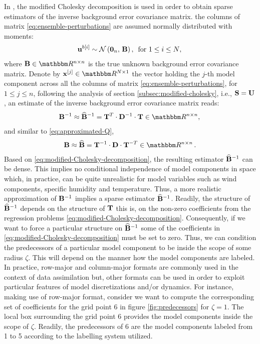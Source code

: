 \documentclass[12pt]{article}
\newcommand{\ub}{{\bf u}}
\newcommand{\T}{{\bf T}}
\newcommand{\ra}{\zeta}
\newcommand{\Nens}{N} \newcommand{\Nobs}{m} \newcommand{\Nstate}{n} \newcommand{\X}{{\bf X}} \newcommand{\x}{{\bf x}} \newcommand{\J}{\mathcal{J}} \newcommand{\lp}{\left (} \newcommand{\rp}{\right )} \newcommand{\lb}{\left [} \newcommand{\rb}{\right ]} \renewcommand{\ln}{\left \|} \newcommand{\rn}{\right \|}
\newcommand{\B}{{\bf B}} \newcommand{\R}{{\bf R}} \newcommand{\N}{M} \newcommand{\y}{{\bf y}} \renewcommand{\H}{{\bf H}} \newcommand{\xm}{{\overline{\bf x}}} \newcommand{\xb}{{\bf x}^{\rm b}} \newcommand{\BAS}{{{\boldsymbol \Phi} }} \newcommand{\bas}{{{ \boldsymbol \phi} }} \newcommand{\w}{{\bf r}} \newcommand{\W}{{\boldsymbol \alpha}} \newcommand{\I}{{\bf I}} \newcommand{\M}{\mathcal{M}} \newcommand{\Nor}{\mathcal{N}} \newcommand{\Y}{{\bf Y}} \newcommand{\xt}{{\bf x}^{\rm true}} \newcommand{\Ho}{{\mathcal{H}}} \newcommand{\lle}{\left \{ } \newcommand{\rle}{\right \}} \newcommand{\dx}{{{\boldsymbol \delta} {\bf x}}}
\renewcommand{\S}{{\bf S}} \newcommand{\errobs}{{\boldsymbol \epsilon}} \newcommand{\errbac}{{\boldsymbol \xi}} \newcommand{\K}{{\bf K}} \newcommand{\Prob}{{\mathcal{P}}} \newcommand{\bases}{{\boldsymbol \Phi}}
\newcommand{\D}{{\bf D}}
\newcommand{\zero}{{\bf 0}}
\newcommand{\BEST}{\widehat{\bf B}}
\newcommand{\U}{{\bf U}}
\begin{document}
In \cite{nino2016enkf-mc}, the modified Cholesky decomposition is used in order to obtain sparse estimators of the inverse background error covariance matrix. the columns of matrix \eqref{eq:ensemble-perturbations} are assumed normally distributed with moments:
\begin{eqnarray}
\ub^{b[i]} \sim \Nor \lp \zero_{\Nstate},\, \B \rp, \,\text{ for $1 \le i \le \Nens$},\,
\end{eqnarray}
where $\B \in \Re^{\Nstate \times \Nstate}$ is the true unknown background error covariance matrix. Denote by $\x^{[j]} \in \Re^{\Nens \times 1}$ the vector holding the $j$-th model component across all the columns of matrix \eqref{eq:ensemble-perturbations}, for $1 \le j \le \Nstate$, following the analysis of section \ref{subsec:modified-cholesky}, i.e., $\S = \U$, an estimate of the inverse background error covariance matrix reads:
\begin{eqnarray}
\label{eq:inverse-B}
\displaystyle
\B^{-1} \approx \BEST^{-1} =  \T^T \cdot \D^{-1} \cdot \T \in \Re^{\Nstate \times \Nstate},\,
\end{eqnarray}
and similar to \eqref{eq:approximated-Q}, 
\begin{eqnarray}
\label{eq:B}
\displaystyle
\B \approx \BEST = \T^{-1} \cdot \D \cdot \T^{-T} \in \Re^{\Nstate \times \Nstate} \,.
\end{eqnarray}
Based on \eqref{eq:modified-Cholesky-decomposition}, the resulting estimator $\BEST^{-1}$ can be dense. This implies no conditional independence of model components in space which, in practice, can be quite unrealistic for model variables such as wind components, specific humidity and temperature. Thus, a more realistic approximation of $\B^{-1}$ implies a sparse estimator $\BEST^{-1}$. Readily, the structure of $\BEST^{-1}$ depends on the structure of $\T$ this is, on the non-zero coefficients from the regression problems \eqref{eq:modified-Cholesky-decomposition}. Consequently, if we want to force a particular structure on $\BEST^{-1}$ some of the coefficients in \eqref{eq:modified-Cholesky-decomposition} must be set to zero. Thus, we can condition the predecessors of a particular model component to be inside the scope of some radius $\ra$. This will depend on the manner how the model components are labeled. In practice, row-major and column-major formats are commonly used in the context of data assimilation but, other formats can be used in order to exploit particular features of model discretizations and/or dynamics. For instance, making use of row-major format, consider we want to compute the corresponding set of coefficients for the grid point 6 in figure \ref{fig:predecessors} for $\ra=1$. The local box surrounding the grid point 6 provides the model components inside the scope of $\ra$. Readily, the predecessors of 6 are the model components labeled from 1 to 5 according to the labelling system utilized.
\end{document}
